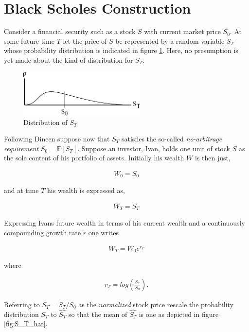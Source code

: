 \section{Black Scholes Construction}

Consider a financial security such as a stock $S$ with current market price $S_0$. At some future time $T$ let the price of $S$ be represented by a random variable $S_T$ whose probability distribution is indicated in figure \ref{fig:S_T}. Here, no presumption is yet made about the kind of distribution for $S_T$. 

\begin{figure}
  \centering
  \includegraphics[width=2.5in]{Images/S_T.eps}
  \caption[Distribution of Stock Prices at time T]
          {Distribution of $S_T$}
  \label{fig:S_T}
\end{figure}

Following Dineen \cite{dineen00} suppose now that $S_T$ satisfies the so-called \emph{no-arbitrage requirement} $S_0 = \mathbb{E}[S_T]$. Suppose an investor, Ivan, holds one unit of stock $S$ as the sole content of his portfolio of assets. Initially his wealth $W$ is then just,

\begin{align*}
W_0 = S_0
\end{align*}

and at time $T$ his wealth is expressed as,

\begin{align*}
W_T = S_T
\end{align*}

Expressing Ivans future wealth in terms of his current wealth and a continuously compounding growth rate $r$ one writes

\begin{align*}
W_T = W_0 e^{r_T}
\end{align*}

where

\begin{align*}
r_T = log(\frac{S_T}{S_0}).
\end{align*}

Referring to $\hat{S_T} = S_T / S_0$ as the \emph{normalized} stock price rescale the probability distribution $S_T$ to $\hat{S_T}$ so that the mean of $\hat{S_T}$ is one as depicted in figure \ref{fig:S_T_hat}.

